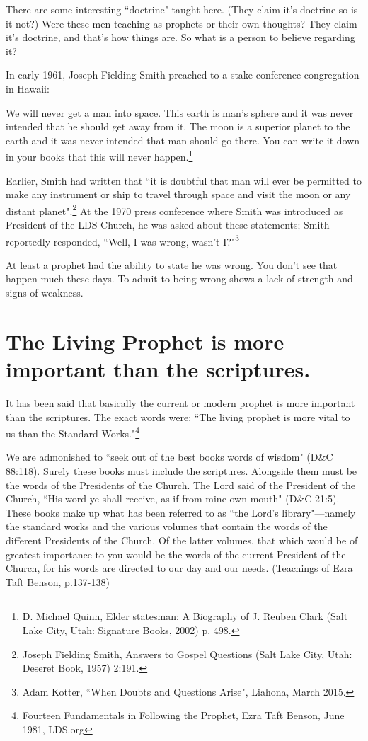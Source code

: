 There are some interesting ``doctrine" taught here. (They claim it's doctrine so
is it not?) Were these men teaching as prophets or their own thoughts? They claim
it's doctrine, and that's how things are. So what is a person to believe regarding
it?

In early 1961, Joseph Fielding Smith preached to a stake conference congregation in 
Hawaii:

\begin{displayquote}
We will never get a man into space. This earth is man's sphere and it was never 
intended that he should get away from it. The moon is a superior planet to the 
earth and it was never intended that man should go there. You can write it down in 
your books that this will never happen.\footnote{D. Michael Quinn, Elder statesman: 
A Biography of J. Reuben Clark (Salt Lake City, Utah: Signature Books, 2002) p. 498.}

Earlier, Smith had written that ``it is doubtful that man will ever be permitted 
to make any instrument or ship to travel through space and visit the moon or any 
distant planet".\footnote{Joseph Fielding Smith, Answers to Gospel Questions (Salt 
Lake City, Utah: Deseret Book, 1957) 2:191.} At the 1970 press conference where Smith 
was introduced as President of the LDS Church, he was asked about these statements; 
Smith reportedly responded, ``Well, I was wrong, wasn't I?"\footnote{
Adam Kotter, ``When Doubts and Questions Arise", Liahona, March 2015.
}
\end{displayquote}

At least a prophet had the ability to state he was wrong. You don't see that happen
much these days. To admit to being wrong shows a lack of strength and signs of
weakness.

\section{The Living Prophet is more important than the scriptures.}

It has been said that basically the current or modern prophet is more important than
the scriptures. The exact words were: 
``The living prophet is more vital to us than the Standard Works."\footnote{Fourteen 
Fundamentals in Following the Prophet, Ezra Taft Benson, June 1981, LDS.org}

\begin{displayquote}
We are admonished to ``seek out of the best books words of wisdom" (D\&C 88:118). 
Surely these books must include the scriptures. Alongside them must be the words of 
the Presidents of the Church. The Lord said of the President of the Church, ``His 
word ye shall receive, as if from mine own mouth" (D\&C 21:5). These books make up 
what has been referred to as ``the Lord’s library"—namely the standard works and 
the various volumes that contain the words of the different Presidents of the Church. 
Of the latter volumes, that which would be of greatest importance to you would be 
the words of the current President of the Church, for his words are directed to our 
day and our needs. (Teachings of Ezra Taft Benson, p.137-138)
\end{displayquote}

